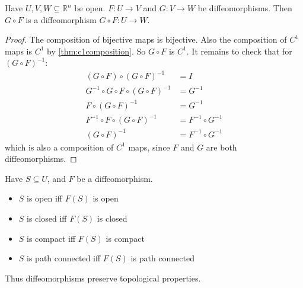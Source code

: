 \begin{simplethm}[Transitivity]
    Have $U, V, W \subseteq \mathbb{R}^n$ be open. $F : U \to V$ and $G : V \to W$ be diffeomorphisms. Then $G \circ F$ is a diffeomorphism $G \circ F : U \to W$.
\end{simplethm}
\begin{proof}
    The composition of bijective maps is bijective. Also the composition of $C^1$ maps is $C^1$ by \ref{thm:c1composition}. So $G \circ F$ is $C^1$. It remains to check that for $(G \circ F)^{-1}$:
    \begin{align*}
        (G \circ F) \circ (G \circ F)^{-1} &= I \\
        G^{-1} \circ G \circ F \circ (G \circ F)^{-1} &= G^{-1} \\
        F \circ (G \circ F)^{-1} &= G^{-1} \\
        F^{-1} \circ F \circ (G \circ F)^{-1} &= F^{-1} \circ G^{-1} \\
        (G \circ F)^{-1} &= F^{-1} \circ G^{-1}
    \end{align*}
    which is also a composition of $C^1$ maps, since $F$ and $G$ are both diffeomorphisms. 
\end{proof}

\begin{simplethm}
    Have $S \subseteq U$, and $F$ be a diffeomorphism.
    \begin{itemize}
        \item $S$ is open iff $F(S)$ is open
        \item $S$ is closed iff $F(S)$ is closed
        \item $S$ is compact iff $F(S)$ is compact
        \item $S$ is path connected iff $F(S)$ is path connected 
    \end{itemize}
\end{simplethm}
\noindent Thus diffeomorphisms preserve topological properties.
